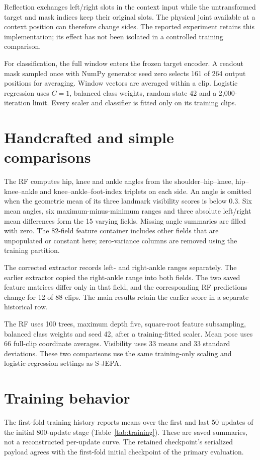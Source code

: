 \documentclass[10pt,twocolumn,letterpaper]{article}
\begin{document}
Reflection exchanges left/right slots in the context input while the untransformed target and mask indices keep their original slots. The physical joint available at a context position can therefore change sides. The reported experiment retains this implementation; its effect has not been isolated in a controlled training comparison.

For classification, the full window enters the frozen target encoder. A readout mask sampled once with NumPy generator seed zero selects 161 of 264 output positions for averaging. Window vectors are averaged within a clip. Logistic regression uses $C=1$, balanced class weights, random state 42 and a 2,000-iteration limit. Every scaler and classifier is fitted only on its training clips.

\section{Handcrafted and simple comparisons}
The RF computes hip, knee and ankle angles from the shoulder--hip--knee, hip--knee--ankle and knee--ankle--foot-index triplets on each side. An angle is omitted when the geometric mean of its three landmark visibility scores is below 0.3. Six mean angles, six maximum-minus-minimum ranges and three absolute left/right mean differences form the 15 varying fields. Missing angle summaries are filled with zero. The 82-field feature container includes other fields that are unpopulated or constant here; zero-variance columns are removed using the training partition.

The corrected extractor records left- and right-ankle ranges separately. The earlier extractor copied the right-ankle range into both fields. The two saved feature matrices differ only in that field, and the corresponding RF predictions change for 12 of 88 clips. The main results retain the earlier score in a separate historical row.

The RF uses 100 trees, maximum depth five, square-root feature subsampling, balanced class weights and seed 42, after a training-fitted scaler. Mean pose uses 66 full-clip coordinate averages. Visibility uses 33 means and 33 standard deviations. These two comparisons use the same training-only scaling and logistic-regression settings as S-JEPA.

\section{Training behavior}
The first-fold training history reports means over the first and last 50 updates of the initial 800-update stage (Table~\ref{tab:training}). These are saved summaries, not a reconstructed per-update curve. The retained checkpoint's serialized payload agrees with the first-fold initial checkpoint of the primary evaluation.
\end{document}
